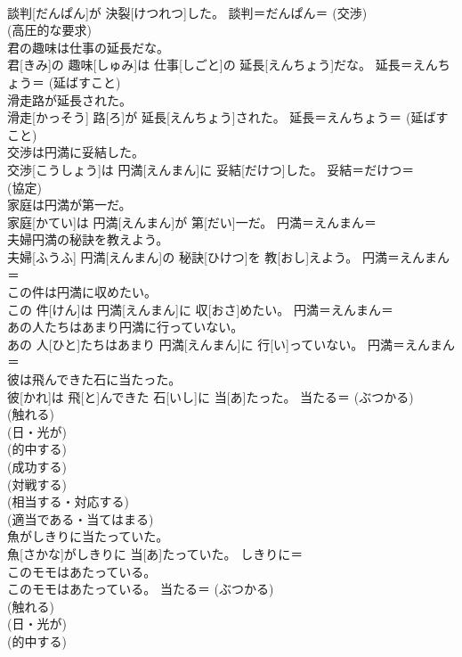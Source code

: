 \documentclass[8pt]{extreport}
\begin{document}
\begin{CJK}{UTF8}{min}
{\\	談判[だんぱん]が 決裂[けつれつ]した。	談判＝だんぱん＝ (交渉) 
\\	(高圧的な要求) 
\\	君の趣味は仕事の延長だな。	
\\	君[きみ]の 趣味[しゅみ]は 仕事[しごと]の 延長[えんちょう]だな。	延長＝えんちょう＝ (延ばすこと) 
\\	滑走路が延長された。	
\\	滑走[かっそう] 路[ろ]が 延長[えんちょう]された。	延長＝えんちょう＝ (延ばすこと) 
\\	交渉は円満に妥結した。	
\\	交渉[こうしょう]は 円満[えんまん]に 妥結[だけつ]した。	妥結＝だけつ＝ 
\\	(協定) 
\\	家庭は円満が第一だ。	
\\	家庭[かてい]は 円満[えんまん]が 第[だい]一だ。	円満＝えんまん＝ 
\\	夫婦円満の秘訣を教えよう。	
\\	夫婦[ふうふ] 円満[えんまん]の 秘訣[ひけつ]を 教[おし]えよう。	円満＝えんまん＝ 
\\	この件は円満に収めたい。	
\\	この 件[けん]は 円満[えんまん]に 収[おさ]めたい。	円満＝えんまん＝ 
\\	あの人たちはあまり円満に行っていない。	
\\	あの 人[ひと]たちはあまり 円満[えんまん]に 行[い]っていない。	円満＝えんまん＝ 
\\	彼は飛んできた石に当たった。	
\\	彼[かれ]は 飛[と]んできた 石[いし]に 当[あ]たった。	当たる＝ (ぶつかる) 
\\	(触れる) 
\\	(日・光が) 
\\	(的中する) 
\\	(成功する) 
\\	(対戦する) 
\\	(相当する・対応する) 
\\	(適当である・当てはまる) 
\\	魚がしきりに当たっていた。	
\\	魚[さかな]がしきりに 当[あ]たっていた。	しきりに＝ 
\\	このモモはあたっている。	
\\	このモモはあたっている。	当たる＝ (ぶつかる) 
\\	(触れる) 
\\	(日・光が) 
\\	(的中する) 
}
\end{CJK}
\end{document}
